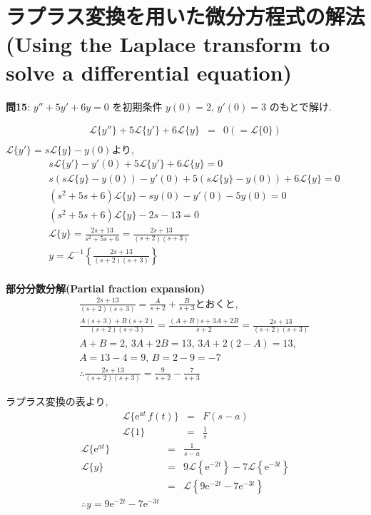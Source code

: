 ﻿\documentclass[a4j]{jarticle}
\begin{document}
\section{ラプラス変換を用いた微分方程式の解法(Using the Laplace transform to solve a differential equation)}

\noindent
\large{\bf{問15}}: \(y''+5y'+6y=0 \) を初期条件 \( y(0)=2 ,\, y'(0)=3 \) のもとで解け.

\begin{eqnarray*}
\mathcal{L} \{ y'' \} + 5 \mathcal{L} \{ y' \} + 6\mathcal{L} \{ y \} &=& 0 ( = \mathcal{L} \{ 0 \} ) \\
\end{eqnarray*}
%
\( \mathcal{L} \{ y' \} = s \mathcal{L} \{ y \} - y(0) \)より,
%
\begin{eqnarray*}
&\,& s\mathcal{L} \{ y' \} -y'(0) + 5 \mathcal{L} \{ y' \} + 6\mathcal{L} \{ y \} = 0 \\
&\,& s(s\mathcal{L} \{ y \} - y(0)) -y'(0) + 5 (s\mathcal{L} \{ y \}-y(0)) + 6\mathcal{L} \{ y \} = 0 \\
&\,& (s^2+5s+6)\mathcal{L} \{ y \} - sy(0) -y'(0) -5y(0) = 0 \\
&\,& (s^2+5s+6)\mathcal{L} \{ y \} - 2s - 13 = 0 \\
&\,& \mathcal{L} \{ y \} = \frac{2s + 13}{s^2+5s+6} = \frac{2s+13}{(s+2)(s+3)} \\
&\,& y=\mathcal{L}^{-1} \left\{ \frac{2s+13}{(s+2)(s+3)} \right\} \\
\end{eqnarray*}
%
\begin{itembox}[l]{\large{\bf{部分分数分解(Partial fraction expansion)}}}
\begin{eqnarray*}
&\,& \frac{2s+13}{(s+2)(s+3)} = \frac{A}{s+2}+\frac{B}{s+3}\text{とおくと,} \\
&\,& \frac{A(s+3)+B(s+2)}{(s+2)(s+3)} = \frac{(A+B)s+3A+2B}{s+2} = \frac{2s+13}{(s+2)(s+3)} \\
&\,& A+B=2 ,\, 3A+2B=13 ,\, 3A+2(2-A)=13 ,\, \\
&\,& A=13-4=9 ,\, B=2-9=-7 \\
&\,& \therefore \frac{2s+13}{(s+2)(s+3)} = \frac{9}{s+2} - \frac{7}{s+3}
\end{eqnarray*}
\end{itembox}
%
ラプラス変換の表より,
\begin{eqnarray*}
\mathcal{L} \{ \mathrm{e}^{at}\,f(t) \} &=& F(s-a) \\
                    \mathcal{L} \{ 1 \} &=& \frac{1}{s}
\end{eqnarray*}
%
\begin{eqnarray*}
\mathcal{L} \{ \mathrm{e}^{at} \} &=& \frac{1}{s-a} \\
\mathcal{L} \{ y \} &=& 9 \mathcal{L} \left\{ \mathrm{e}^{-2t} \right\} -7 \mathcal{L} \left\{ \mathrm{e}^{-3t} \right\} \\
                    &=& \mathcal{L} \left\{ 9\mathrm{e}^{-2t} - 7 \mathrm{e}^{-3t} \right\} \\
\therefore y = 9\mathrm{e}^{-2t} - 7 \mathrm{e}^{-3t}
\end{eqnarray*}
\end{document}
